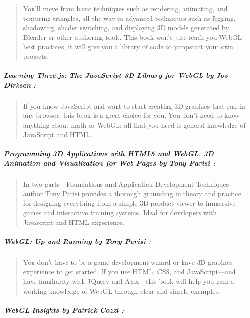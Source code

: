 \documentclass[]{article}
\begin{document}
\begin{quote}
You'll move from basic techniques such as rendering, animating, and
texturing triangles, all the way to advanced techniques such as fogging,
shadowing, shader switching, and displaying 3D models generated by
Blender or other authoring tools. This book won't just teach you WebGL
best practices, it will give you a library of code to jumpstart your own
projects.
\end{quote}

\subparagraph{\emph{Learning Three.js: The JavaScript 3D Library for
WebGL} by Jos Dirksen \cite{threejsbook2013dirksen}:}\label{learning-three.js-the-javascript-3d-library-for-webgl-by-jos-dirksen-threejsbook2013dirksen}

\begin{quote}
If you know JavaScript and want to start creating 3D graphics that run
in any browser, this book is a great choice for you. You don't need to
know anything about math or WebGL; all that you need is general
knowledge of JavaScript and HTML.
\end{quote}

\subparagraph{\emph{Programming 3D Applications with HTML5 and WebGL: 3D
Animation and Visualization for Web Pages} by Tony Parisi \cite{webglbook2014parisi}:}\label{programming-3d-applications-with-html5-and-webgl-3d-animation-and-visualization-for-web-pages-by-tony-parisi-webglbook2014parisi}

\begin{quote}
In two parts---Foundations and Application Development
Techniques---author Tony Parisi provides a thorough grounding in theory
and practice for designing everything from a simple 3D product viewer to
immersive games and interactive training systems. Ideal for developers
with Javascript and HTML experience.
\end{quote}

\subparagraph{\emph{WebGL: Up and Running} by Tony Parisi
\cite{webglbook2012parisi}:}\label{webgl-up-and-running-by-tony-parisi-webglbook2012parisi}

\begin{quote}
You don't have to be a game development wizard or have 3D graphics
experience to get started. If you use HTML, CSS, and JavaScript---and
have familiarity with JQuery and Ajax---this book will help you gain a
working knowledge of WebGL through clear and simple examples.
\end{quote}

\subparagraph{\emph{WebGL Insights} by Patrick Cozzi \cite{Cozzi15}:}\label{webgl-insights-by-patrick-cozzi-cozzi15}
\end{document}
